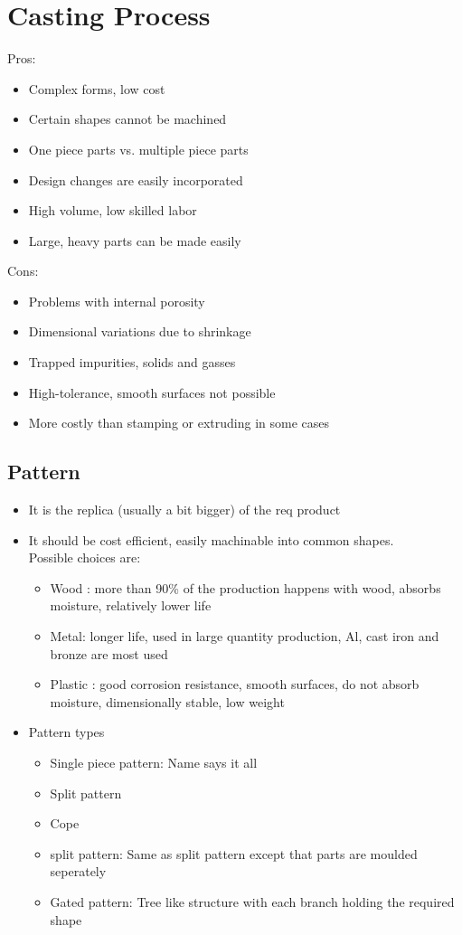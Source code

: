\documentclass{article}
\begin{document}
\section{Casting Process}

Pros:
\begin{itemize}
	\item Complex forms, low cost
	\item Certain shapes cannot be machined
	\item One piece parts vs. multiple piece parts
	\item Design changes are easily incorporated
	\item High volume, low skilled labor
	\item Large, heavy parts can be made easily
\end{itemize}

\noindent Cons:
\begin{itemize}
	\item Problems with internal porosity
	\item Dimensional variations due to shrinkage
	\item Trapped impurities, solids and gasses
	\item High-tolerance, smooth surfaces not possible
	\item More costly than stamping or extruding in some cases
\end{itemize}

\subsection{Pattern} 
\begin{itemize}
	\item It is the replica (usually a bit bigger) of the req product 
	\item It should be cost efficient, easily machinable into common shapes.\\
	Possible choices are: 
	\begin{itemize}
		\item Wood : more than 90\% of the production happens with wood, absorbs moisture, relatively lower life
		\item Metal: longer life, used in large quantity production, Al, cast iron and bronze are most used
		\item Plastic : good corrosion resistance, smooth surfaces, do not absorb moisture, dimensionally stable, low weight
	\end{itemize}
	\item Pattern types
	\begin{itemize}
		\item Single piece pattern: Name says it all
		\item Split pattern
		\item Cope \item split pattern: Same as split pattern except that parts are moulded seperately
		\item Gated pattern: Tree like structure with each branch holding the required shape
	\end{itemize}
\end{itemize}
\end{document}
